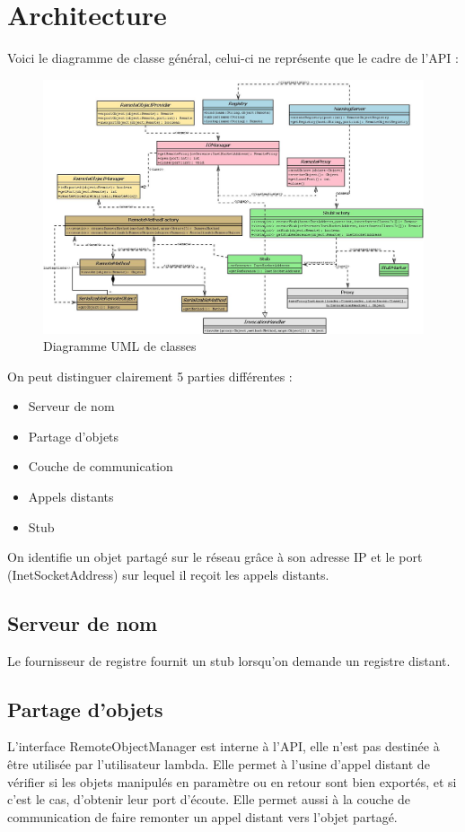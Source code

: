 \chapter{Architecture}

\hspace{-.6cm}Voici le diagramme de classe général, celui-ci ne représente que le cadre de l'API :
\begin{figure}[H]
\begin{center}
\includegraphics[scale=0.4,angle=90]{img/diag_classes.jpeg}
\caption{Diagramme UML de classes}
\end{center}
\end{figure}
\medskip
On peut distinguer clairement 5 parties différentes :
\begin{itemize}
\item Serveur de nom
\item Partage d'objets
\item Couche de communication
\item Appels distants
\item Stub
\end{itemize}
\medskip

On identifie un objet partagé sur le réseau grâce à son adresse IP et le port (InetSocketAddress) sur lequel il reçoit les appels distants.

\section{Serveur de nom}
\hspace{-.6cm}Le fournisseur de registre fournit un stub lorsqu'on demande un registre distant.

\section{Partage d'objets}
L'interface RemoteObjectManager est interne à l'API, elle n'est pas destinée à être utilisée par l'utilisateur lambda. Elle permet à l'usine d'appel distant de vérifier si les objets manipulés en paramètre ou en retour sont bien exportés, et si c'est le cas, d'obtenir leur port d'écoute. Elle permet aussi à la couche de communication de faire remonter un appel distant vers l'objet partagé.

